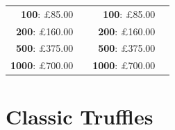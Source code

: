\documentclass[11pt, english]{article}
\begin{document}
\begin{table}[h]
\begin{center}
\begin{tabular}{r|p{4cm}r|p{4cm}}
		\textbf{100}: \pounds85.00 & & \textbf{100}: \pounds85.00 & \\
		\textbf{200}: \pounds160.00 & & \textbf{200}: \pounds160.00 & \\
		\textbf{500}: \pounds375.00 & & \textbf{500}: \pounds375.00 & \\
		\textbf{1000}: \pounds700.00 & & \textbf{1000}: \pounds700.00 & \\
	\end{tabular}
	\end{center}
	\end{table}

	\vspace{1cm}

\section{Classic Truffles}
\end{document}
